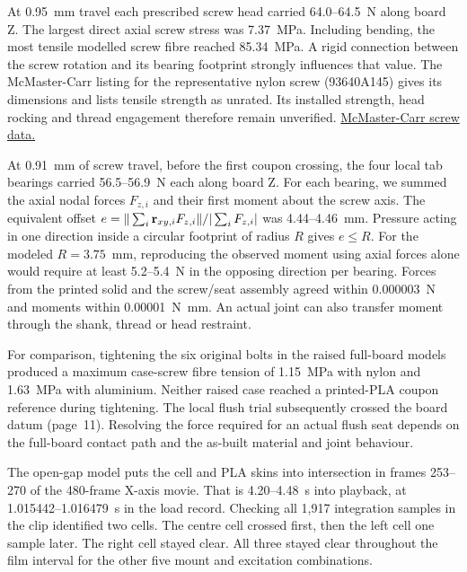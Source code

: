 At 0.95~mm travel each prescribed screw head carried 64.0--64.5~N along board Z. The largest direct axial screw stress was 7.37~MPa. Including bending, the most tensile modelled screw fibre reached 85.34~MPa. A rigid connection between the screw rotation and its bearing footprint strongly influences that value. The McMaster-Carr listing for the representative nylon screw (93640A145) gives its dimensions and lists tensile strength as unrated. Its installed strength, head rocking and thread engagement therefore remain unverified. \href{https://www.mcmaster.com/products/nylon-allen-screws/}{McMaster-Carr screw data.}

At 0.91~mm of screw travel, before the first coupon crossing, the four local tab bearings carried 56.5--56.9~N each along board Z. For each bearing, we summed the axial nodal forces $F_{z,i}$ and their first moment about the screw axis. The equivalent offset $e=\|\sum_i {\bf r}_{xy,i}F_{z,i}\|/|\sum_i F_{z,i}|$ was 4.44--4.46~mm. Pressure acting in one direction inside a circular footprint of radius $R$ gives $e\leq R$. For the modeled $R=3.75$~mm, reproducing the observed moment using axial forces alone would require at least 5.2--5.4~N in the opposing direction per bearing. Forces from the printed solid and the screw/seat assembly agreed within 0.000003~N and moments within 0.00001~N~mm. An actual joint can also transfer moment through the shank, thread or head restraint.

For comparison, tightening the six original bolts in the raised full-board models produced a maximum case-screw fibre tension of 1.15~MPa with nylon and 1.63~MPa with aluminium. Neither raised case reached a printed-PLA coupon reference during tightening. The local flush trial subsequently crossed the board datum (page~11). Resolving the force required for an actual flush seat depends on the full-board contact path and the as-built material and joint behaviour.

\newpage
{}
The open-gap model puts the cell and PLA skins into intersection in frames 253--270 of the 480-frame X-axis movie. That is 4.20--4.48~s into playback, at 1.015442--1.016479~s in the load record. Checking all 1,917 integration samples in the clip identified two cells. The centre cell crossed first, then the left cell one sample later. The right cell stayed clear. All three stayed clear throughout the film interval for the other five mount and excitation combinations.

